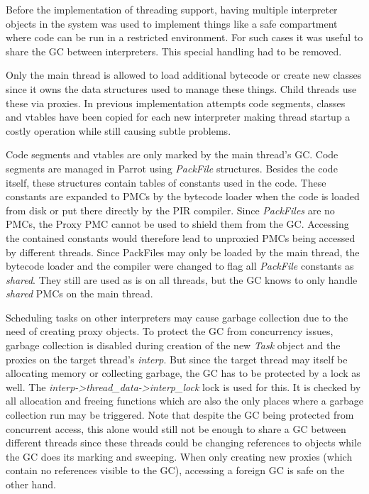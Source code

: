 \documentclass[bachelor,english]{hgbthesis}
\begin{document}
Before the implementation of threading support, having multiple interpreter objects in the system was used to implement things like a safe compartment where code can be run in a restricted environment. For such cases it was useful to share the GC between interpreters. This special handling had to be removed.

Only the main thread is allowed to load additional bytecode or create new classes since it owns the data structures used to manage these things. Child threads use these via proxies. In previous implementation attempts code segments, classes and vtables have been copied for each new interpreter making thread startup a costly operation while still causing subtle problems.

Code segments and vtables are only marked by the main thread's GC. Code segments are managed in Parrot using \textit{PackFile} structures. Besides the code itself, these structures contain tables of constants used in the code. These constants are expanded to PMCs by the bytecode loader when the code is loaded from disk or put there directly by the PIR compiler. Since \textit{PackFiles} are no PMCs, the Proxy PMC cannot be used to shield them from the GC. Accessing the contained constants would therefore lead to unproxied PMCs being accessed by different threads. Since PackFiles may only be loaded by the main thread, the bytecode loader and the compiler were changed to flag all \textit{PackFile} constants as \textit{shared}. They still are used as is on all threads, but the GC knows to only handle \textit{shared} PMCs on the main thread.

Scheduling tasks on other interpreters may cause garbage collection due to the need of creating proxy objects. To protect the GC from concurrency issues, garbage collection is disabled during creation of the new \textit{Task} object and the proxies on the target thread's \textit{interp}. But since the target thread may itself be allocating memory or collecting garbage, the GC has to be protected by a lock as well. The \textit{interp->thread\_data->interp\_lock} lock is used for this. It is checked by all allocation and freeing functions which are also the only places where a garbage collection run may be triggered. Note that despite the GC being protected from concurrent access, this alone would still not be enough to share a GC between different threads since these threads could be changing references to objects while the GC does its marking and sweeping. When only creating new proxies (which contain no references visible to the GC), accessing a foreign GC is safe on the other hand.
\end{document}
